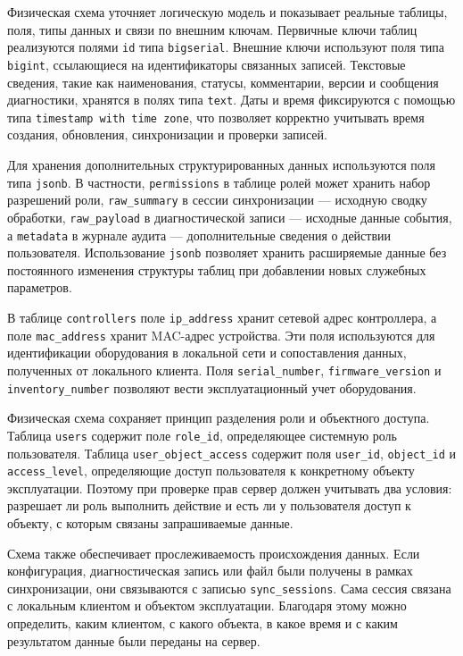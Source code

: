 Физическая схема уточняет логическую модель и показывает реальные таблицы, поля, типы данных и связи по внешним ключам. Первичные ключи таблиц реализуются полями \texttt{id} типа \texttt{bigserial}. Внешние ключи используют поля типа \texttt{bigint}, ссылающиеся на идентификаторы связанных записей. Текстовые сведения, такие как наименования, статусы, комментарии, версии и сообщения диагностики, хранятся в полях типа \texttt{text}. Даты и время фиксируются с помощью типа \texttt{timestamp with time zone}, что позволяет корректно учитывать время создания, обновления, синхронизации и проверки записей.

Для хранения дополнительных структурированных данных используются поля типа \texttt{jsonb}. В частности, \texttt{permissions} в таблице ролей может хранить набор разрешений роли, \texttt{raw\_summary} в сессии синхронизации --- исходную сводку обработки, \texttt{raw\_payload} в диагностической записи --- исходные данные события, а \texttt{metadata} в журнале аудита --- дополнительные сведения о действии пользователя. Использование \texttt{jsonb} позволяет хранить расширяемые данные без постоянного изменения структуры таблиц при добавлении новых служебных параметров.

В таблице \texttt{controllers} поле \texttt{ip\_address} хранит сетевой адрес контроллера, а поле \texttt{mac\_address} хранит MAC-адрес устройства. Эти поля используются для идентификации оборудования в локальной сети и сопоставления данных, полученных от локального клиента. Поля \texttt{serial\_number}, \texttt{firmware\_version} и \texttt{inventory\_number} позволяют вести эксплуатационный учет оборудования.

Физическая схема сохраняет принцип разделения роли и объектного доступа. Таблица \texttt{users} содержит поле \texttt{role\_id}, определяющее системную роль пользователя. Таблица \texttt{user\_object\_access} содержит поля \texttt{user\_id}, \texttt{object\_id} и \texttt{access\_level}, определяющие доступ пользователя к конкретному объекту эксплуатации. Поэтому при проверке прав сервер должен учитывать два условия: разрешает ли роль выполнить действие и есть ли у пользователя доступ к объекту, с которым связаны запрашиваемые данные.

Схема также обеспечивает прослеживаемость происхождения данных. Если конфигурация, диагностическая запись или файл были получены в рамках синхронизации, они связываются с записью \texttt{sync\_sessions}. Сама сессия связана с локальным клиентом и объектом эксплуатации. Благодаря этому можно определить, каким клиентом, с какого объекта, в какое время и с каким результатом данные были переданы на сервер.

